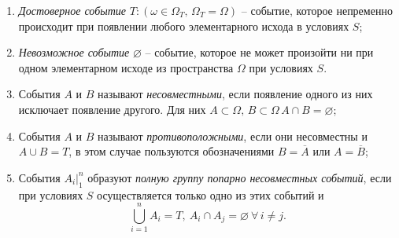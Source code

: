 \documentclass[polytech/stats/exam-2023/stats-exam-2023.tex]{subfiles}
\begin{document}
    \begin{enumerate}
        \item \textit{Достоверное событие} $T: \left(\omega \in \Omega_T, \, \Omega_T = \Omega\right)$ -- событие, которое непременно
        происходит при появлении любого элементарного исхода в условиях $S$;
        \item \textit{Невозможное событие} $\varnothing$ -- событие, которое не может произойти ни при одном элементарном исходе
        из пространства $\Omega$ при условиях $S$.
        \item События $A$ и $B$ называют \textit{несовместными}, если появление одного из них исключает появление другого. Для них
        $A \subset \Omega, \, B \subset \Omega\, A \cap B = \varnothing$;
        \item События $A$ и $B$ называют \textit{противоположными}, если они несовместны и $A \cup B = T$, в этом случае пользуются
        обозначениями $B = \overline{A}$ или $A = \overline{B}$;
        \item События $\displaystyle A_i \vert_1^n$ образуют \textit{полную группу попарно несовместных событий}, если при условиях $S$
        осуществляется только одно из этих событий и 
        \begin{equation*}
            \bigcup_{i = 1}^n A_i = T, \ A_i \cap A_j = \varnothing \ \forall \, i \neq j.
        \end{equation*}
    \end{enumerate}
    \newpage
\end{document}
